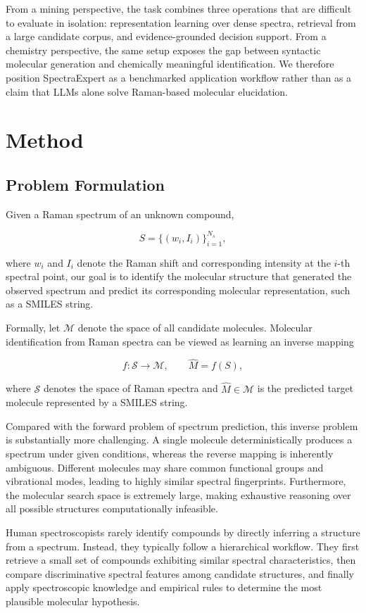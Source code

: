 \documentclass[conference]{IEEEtran}
\begin{document}
From a mining perspective, the task combines three operations that are difficult to evaluate in isolation: representation learning over dense spectra, retrieval from a large candidate corpus, and evidence-grounded decision support. From a chemistry perspective, the same setup exposes the gap between syntactic molecular generation and chemically meaningful identification. We therefore position SpectraExpert as a benchmarked application workflow rather than as a claim that LLMs alone solve Raman-based molecular elucidation.



\section{Method}

\subsection{Problem Formulation}

Given a Raman spectrum of an unknown compound,

$$
S=\{(w_i,I_i)\}_{i=1}^{N_s},
$$

where $w_i$ and $I_i$ denote the Raman shift and corresponding intensity at the $i$-th spectral point, our goal is to identify the molecular structure that generated the observed spectrum and predict its corresponding molecular representation, such as a SMILES string.

Formally, let $\mathcal{M}$ denote the space of all candidate molecules. Molecular identification from Raman spectra can be viewed as learning an inverse mapping

$$
f:\mathcal{S}\rightarrow\mathcal{M},\qquad \hat{M}=f(S),
$$

where $\mathcal{S}$ denotes the space of Raman spectra and $\hat{M}\in\mathcal{M}$ is the predicted target molecule represented by a SMILES string.

Compared with the forward problem of spectrum prediction, this inverse problem is substantially more challenging. A single molecule deterministically produces a spectrum under given conditions, whereas the reverse mapping is inherently ambiguous. Different molecules may share common functional groups and vibrational modes, leading to highly similar spectral fingerprints. Furthermore, the molecular search space is extremely large, making exhaustive reasoning over all possible structures computationally infeasible.

Human spectroscopists rarely identify compounds by directly inferring a structure from a spectrum. Instead, they typically follow a hierarchical workflow. They first retrieve a small set of compounds exhibiting similar spectral characteristics, then compare discriminative spectral features among candidate structures, and finally apply spectroscopic knowledge and empirical rules to determine the most plausible molecular hypothesis.
\end{document}
